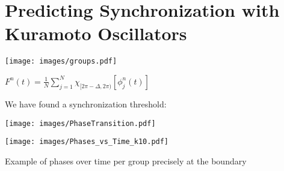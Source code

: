 \section{Predicting Synchronization with Kuramoto Oscillators}

\begin{minipage}{0.23\textwidth}
  {\texttt{[image: images/groups.pdf]}}
\end{minipage}
\begin{minipage}{0.25\textwidth}
  
  \begin{center}
  \end{center}
  
  \usualsep\usualsep
  
  \usualsep  
  
  \usualsep
  \begin{flushright}
    
    \color{Orange}
    $ F^{n}(t) = \frac{1}{N} \sum\limits_{j=1}^N \chi_{[2\pi-\Delta,2\pi)}\left[ \phi^n_j(t) \right] $
  \end{flushright}
  
\end{minipage}

\usualsep\usualsep
\begin{minipage}{0.253\textwidth}
  
  \begin{center}
    
     We have found a synchronization threshold:
    
    \usualsep
  \end{center}
  
  \begin{center}
    \texttt{[image: images/PhaseTransition.pdf]}
  \end{center}
\end{minipage}
\begin{minipage}{0.22\textwidth}
  \begin{flushright}
    \texttt{[image: images/Phases\_vs\_Time\_k10.pdf]}
  \end{flushright}
  
   Example of phases over time per group precisely at the boundary
\end{minipage}


